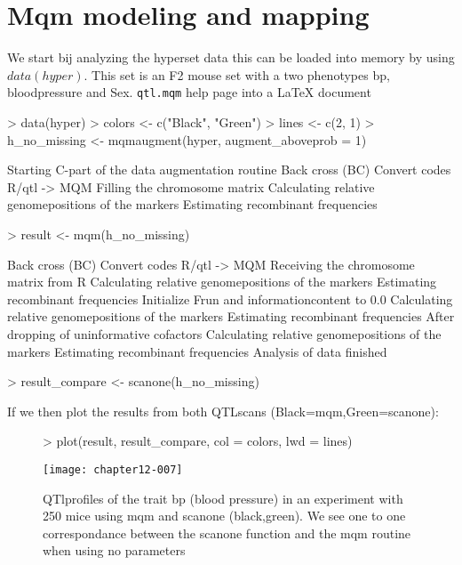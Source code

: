 \documentclass[11pt]{article}
\begin{document}
\section{Mqm modeling and mapping}
We start bij analyzing the hyperset data this can be loaded into memory by using $data(hyper)$. This set is an F2 mouse set with a two phenotypes bp, bloodpressure and Sex. \texttt{qtl.mqm} help page into a \LaTeX{} document
\\
\begin{Schunk}
\begin{Sinput}
> data(hyper)
> colors <- c("Black", "Green")
> lines <- c(2, 1)
> h_no_missing <- mqmaugment(hyper, augment_aboveprob = 1)
\end{Sinput}
\begin{Soutput}
Starting C-part of the data augmentation routine
Back cross (BC)
Convert codes R/qtl -> MQM
Filling the chromosome matrix
Calculating relative genomepositions of the markers
Estimating recombinant frequencies
\end{Soutput}
\begin{Sinput}
> result <- mqm(h_no_missing)
\end{Sinput}
\begin{Soutput}
Back cross (BC)
Convert codes R/qtl -> MQM
Receiving the chromosome matrix from R
Calculating relative genomepositions of the markers
Estimating recombinant frequencies
Initialize Frun and informationcontent to 0.0
Calculating relative genomepositions of the markers
Estimating recombinant frequencies
After dropping of uninformative cofactors
Calculating relative genomepositions of the markers
Estimating recombinant frequencies
Analysis of data finished
\end{Soutput}
\begin{Sinput}
> result_compare <- scanone(h_no_missing)
\end{Sinput}
\end{Schunk}
If we then plot the results from both QTLscans (Black=mqm,Green=scanone):
\begin{figure}[h]
\begin{Schunk}
\begin{Sinput}
> plot(result, result_compare, col = colors, lwd = lines)
\end{Sinput}
\end{Schunk}
\texttt{[image: chapter12-007]}
\caption{QTlprofiles of the trait bp (blood pressure) in an experiment with 250 mice using mqm and scanone (black,green). We see one to 
one correspondance between the scanone function and the mqm routine when using no parameters}
\end{figure}
\end{document}
